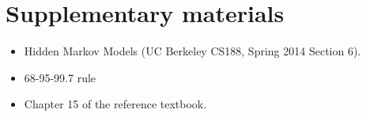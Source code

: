 \documentclass[11pt, a4paper]{article}
\begin{document}
\newpage

\section*{Supplementary materials}

\begin{itemize}
    \item Hidden Markov Models (UC Berkeley CS188, Spring 2014 Section 6).


    \item 68-95-99.7 rule


    \item Chapter 15 of the reference textbook.
\end{itemize}
\end{document}
